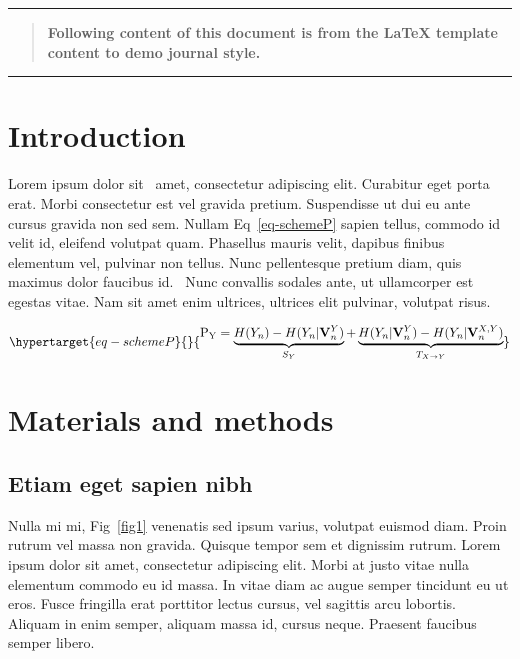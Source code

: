 \documentclass[
  10pt,
  letterpaper,
]{article}
\begin{document}
\begin{center}\rule{0.5\linewidth}{0.5pt}\end{center}

\begin{quote}
\textbf{Following content of this document is from the LaTeX template
content to demo journal style.}
\end{quote}

\begin{center}\rule{0.5\linewidth}{0.5pt}\end{center}

\hypertarget{introduction}{%
\section{Introduction}\label{introduction}}

Lorem ipsum dolor sit~\citep{bib1} amet, consectetur adipiscing elit.
Curabitur eget porta erat. Morbi consectetur est vel gravida pretium.
Suspendisse ut dui eu ante cursus gravida non sed sem. Nullam
Eq~\ref{eq-schemeP} sapien tellus, commodo id velit id, eleifend
volutpat quam. Phasellus mauris velit, dapibus finibus elementum vel,
pulvinar non tellus. Nunc pellentesque pretium diam, quis maximus dolor
faucibus id.~\citep{bib2} Nunc convallis sodales ante, ut ullamcorper
est egestas vitae. Nam sit amet enim ultrices, ultrices elit pulvinar,
volutpat risus.

\begin{equation}\protect\hypertarget{eq-schemeP}{}{
\begin{aligned}
\mathrm{P_Y} = \underbrace{H(Y_n) - H(Y_n|\mathbf{V}^{Y}_{n})}_{S_Y} + \underbrace{H(Y_n|\mathbf{V}^{Y}_{n})- H(Y_n|\mathbf{V}^{X,Y}_{n})}_{T_{X\rightarrow Y}}
\end{aligned}
}\label{eq-schemeP}\end{equation}

\hypertarget{materials-and-methods}{%
\section{Materials and methods}\label{materials-and-methods}}

\hypertarget{etiam-eget-sapien-nibh}{%
\subsection{Etiam eget sapien nibh}\label{etiam-eget-sapien-nibh}}

Nulla mi mi, Fig~\ref{fig1} venenatis sed ipsum varius, volutpat euismod
diam. Proin rutrum vel massa non gravida. Quisque tempor sem et
dignissim rutrum. Lorem ipsum dolor sit amet, consectetur adipiscing
elit. Morbi at justo vitae nulla elementum commodo eu id massa. In vitae
diam ac augue semper tincidunt eu ut eros. Fusce fringilla erat
porttitor lectus cursus, vel sagittis arcu lobortis. Aliquam in enim
semper, aliquam massa id, cursus neque. Praesent faucibus semper libero.
\end{document}
